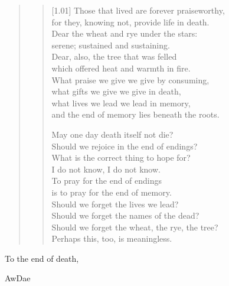 \begin{quote}
\begin{verse}[1.01\textwidth]
    Those that lived are forever praiseworthy,\\
    for they, knowing not, provide life in death.\\
    Dear the wheat and rye under the stars:\\
    serene; sustained and sustaining.\\
    Dear, also, the tree that was felled\\
    which offered heat and warmth in fire.\\
    What praise we give we give by consuming,\\
    what gifts we give we give in death,\\
    what lives we lead we lead in memory,\\
    and the end of memory lies beneath the roots.


    May one day death itself not die?\\
    Should we rejoice in the end of endings?\\
    What is the correct thing to hope for?\\
    I do not know, I do not know.\\
    To pray for the end of endings\\
    is to pray for the end of memory.\\
    Should we forget the lives we lead?\\
    Should we forget the names of the dead?\\
    Should we forget the wheat, the rye, the tree?\\
    Perhaps this, too, is meaningless.
  \end{verse}

\end{quote}
To the end of death,

AwDae

